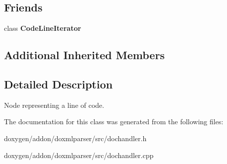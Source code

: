\subsection*{Friends}
\begin{DoxyCompactItemize}
\item 
\mbox{\label{class_code_line_handler_a58edddfb3f15948fd8e3e8c67db55d01}} 
class {\bfseries Code\+Line\+Iterator}
\end{DoxyCompactItemize}
\subsection*{Additional Inherited Members}


\subsection{Detailed Description}
Node representing a line of code. 



The documentation for this class was generated from the following files\+:\begin{DoxyCompactItemize}
\item 
doxygen/addon/doxmlparser/src/dochandler.\+h\item 
doxygen/addon/doxmlparser/src/dochandler.\+cpp\end{DoxyCompactItemize}
